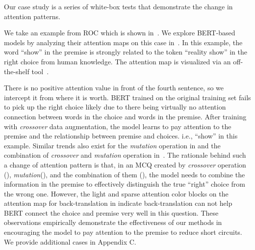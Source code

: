 
Our case study is a series of white-box tests that demonstrate
the change in attention patterns.

We take an example from ROC which is shown in~.
We explore BERT-based models by 
analyzing their attention maps on this case in~.  
In this example, the word ``show'' in the premise is strongly
related to the token ``reality show'' in the right choice from human knowledge. 
The attention map is visualized via an off-the-shelf tool~\cite{vig-2019-multiscale}.


There is no positive attention value in front of the fourth sentence, 
so we intercept it from where it is worth. 
BERT trained on the original training set fails 
to pick up the right choice likely due to there being 
virtually no attention connection between words in 
the choice and words in the premise.
After training with \textit{crossover} data augmentation, 
the model learns  
to pay attention to the premise and the relationship 
between premise and choices. 
i.e., ``show'' in this example. 
Similar trends also exist for the \textit{mutation} operation in  
and the combination of \textit{crossover} 
and \textit{mutation} operation in~. 
The rationale behind 
such a change of attention pattern is that, 
in an MCQ created by \textit{crossover} operation (), \textit{mutation}(), 
and the combination of them (), 
the model needs to combine the information 
in the premise to effectively 
distinguish the true ``right'' choice from the wrong one. 
However, the light and sparse attention color blocks on the attention map for back-translation 
in  indicate back-translation 
can not help BERT connect the choice and premise very well in this question.
These observations empirically demonstrate the effectiveness of our methods 
in encouraging the model to pay attention to the premise to reduce 
short circuits. We provide additional cases in Appendix C. 

